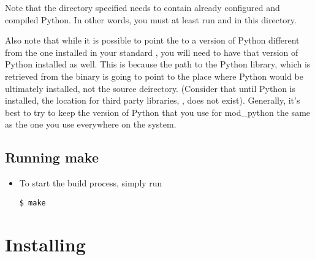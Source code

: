 \begin{itemize}
Note that the directory specified needs to contain already configured and
compiled Python. In other words, you must at least run  and
 in this directory.

Also note that while it is possible to point the
 to a version of Python different from the
one installed in your standard , you will need to have
that version of Python installed as well.  This is because the path to
the Python library, which is retrieved from the  binary
is going to point to the place where Python would be ultimately
installed, not the source deirectory. (Consider that until Python is
installed, the location for third party libraries,
, does not exist). Generally, it's best to try
to keep the version of Python that you use for mod_python the same as
the one you use everywhere on the system.

\end{itemize}

\subsection{Running make\label{inst-make}}

\begin{itemize}

\item
To start the build process, simply run
\begin{verbatim}
$ make
\end{verbatim}



\end{itemize}

\section{Installing\label{inst-installing}}

